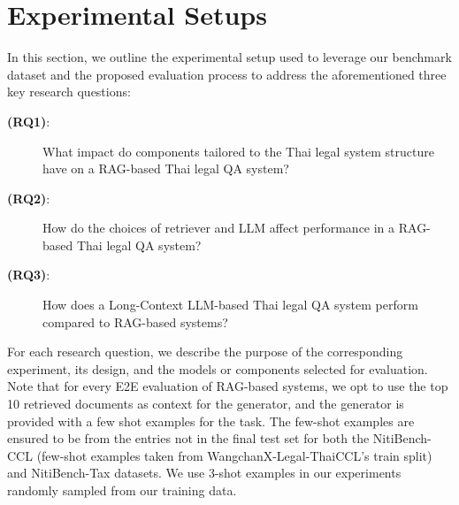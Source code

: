 \section{Experimental Setups}
\label{sec:evaluation}
In this section, we outline the experimental setup used to leverage our benchmark dataset and the proposed evaluation process to address the aforementioned three key research questions:
%
\begin{description}
\item [\textbf{(RQ1)}:] What impact do components tailored to the Thai legal system structure have on a RAG-based Thai legal QA system?

\item [\textbf{(RQ2)}:] How do the choices of retriever and LLM affect performance in a RAG-based Thai legal QA system?

\item [\textbf{(RQ3)}:] How does a Long-Context LLM-based Thai legal QA system perform compared to RAG-based systems?
\end{description}

For each research question, we describe the purpose of the corresponding experiment, its design, and the models or components selected for evaluation. 
%
Note that for every E2E evaluation of RAG-based systems, we opt to use the top 10 retrieved documents as context for the generator, and the generator is provided with a few shot examples for the task. 
%
The few-shot examples are ensured to be from the entries not in the final test set for both the NitiBench-CCL (few-shot examples taken from WangchanX-Legal-ThaiCCL's train split) and NitiBench-Tax datasets. We use 3-shot examples in our experiments randomly sampled from our training data.

